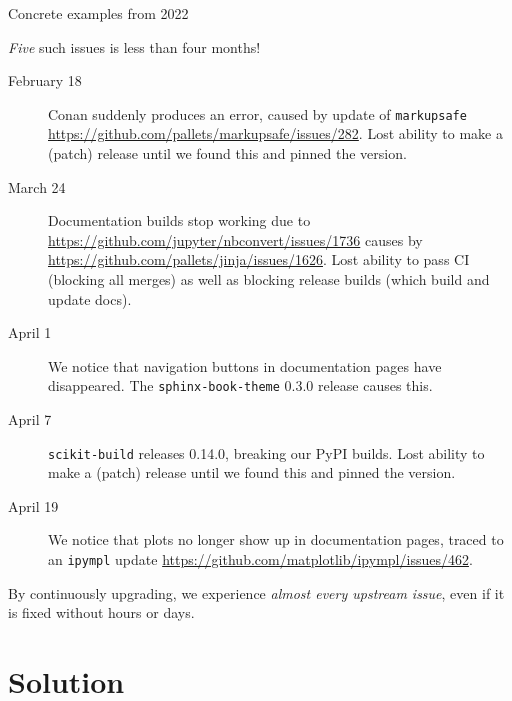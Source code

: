 \documentclass[english,aspectratio=1610,smaller]{beamer}
\begin{document}
\begin{frame}[fragile]{Concrete examples from 2022}
  \begin{block}{\emph{Five} such issues is less than four months!}
    \begin{description}
      \item[February 18] Conan suddenly produces an error, caused by update of \texttt{markupsafe} \url{https://github.com/pallets/markupsafe/issues/282}.
        Lost ability to make a (patch) release until we found this and pinned the version.
      \item[March 24] Documentation builds stop working due to \url{https://github.com/jupyter/nbconvert/issues/1736} causes by \url{https://github.com/pallets/jinja/issues/1626}.
        Lost ability to pass CI (blocking all merges) as well as blocking release builds (which build and update docs).
      \item[April 1] We notice that navigation buttons in documentation pages have disappeared. The \texttt{sphinx-book-theme} 0.3.0 release causes this.
      \item[April 7] \texttt{scikit-build} releases 0.14.0, breaking our PyPI builds.
        Lost ability to make a (patch) release until we found this and pinned the version.
      \item[April 19] We notice that plots no longer show up in documentation pages, traced to an \texttt{ipympl} update \url{https://github.com/matplotlib/ipympl/issues/462}.
    \end{description}
  \end{block}
  By continuously upgrading, we experience \emph{almost every upstream issue}, even if it is fixed without hours or days.
\end{frame}

\section{Solution}
\end{document}
